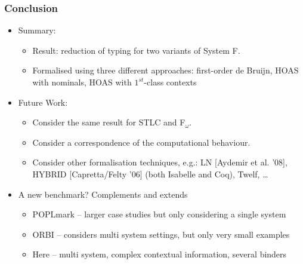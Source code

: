 \documentclass[english,pdftex,dvipsnames,leqno,handout]{beamer}%
\newcommand{\mycite}[1]{{\color{greenblue}\scriptsize[#1]}}
\begin{document}
\begin{frame}
  \frametitle{Conclusion}
  \begin{itemize}
  \item Summary:
    \begin{itemize}
    \item Result: reduction of typing for two variants of System F.
    \item Formalised using three different approaches: first-order de Bruijn, HOAS with nominals, HOAS with $1^{st}$-class contexts
    \end{itemize}\pause
  \item Future Work:
    \begin{itemize}
    \item Consider the same result for STLC and F$_\omega$.
    \item Consider a correspondence of the computational behaviour.
    \item Consider other formalisation techniques, e.g.: LN \mycite{Aydemir et al. '08}, HYBRID \mycite{Capretta/Felty '06} (both Isabelle and Coq), Twelf, \ldots
    \end{itemize}\pause
  \item A new benchmark? Complements and extends
    \begin{itemize}
    \item POPLmark -- larger case studies but only considering a single system
    \item ORBI -- considers multi system settings, but only very small examples
    \item Here -- multi system, complex contextual information, several binders
    \end{itemize}
  \end{itemize}
\end{frame}
\end{document}
